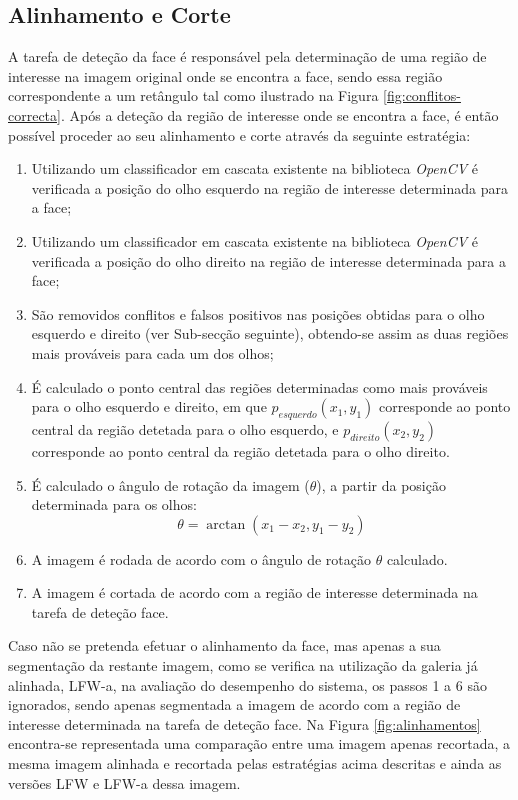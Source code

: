 \subsection{Alinhamento e Corte} \label{sec:alinhamentoEcorte}
A tarefa de deteção da face é responsável pela determinação de uma região de interesse na imagem original onde se encontra a face, sendo essa região correspondente a um retângulo tal como ilustrado na Figura \ref{fig:conflitos-correcta}. Após a deteção da região de interesse onde se encontra a face, é então possível proceder ao seu alinhamento e corte através da seguinte estratégia:

\begin{enumerate}
\item Utilizando um classificador em cascata existente na biblioteca \textit{OpenCV} é verificada a posição do olho esquerdo na região de interesse determinada para a face;
\item Utilizando um classificador em cascata existente na biblioteca \textit{OpenCV} é verificada a posição do olho direito na região de interesse determinada para a face;
\item São removidos conflitos e falsos positivos nas posições obtidas para o olho esquerdo e direito (ver Sub-secção seguinte), obtendo-se assim as duas regiões mais prováveis para cada um dos olhos;
\item É calculado o ponto central das regiões determinadas como mais prováveis para o olho esquerdo e direito, em que $p_{esquerdo}(x_1,y_1)$ corresponde ao ponto central da região detetada para o olho esquerdo, e  $p_{direito}(x_2,y_2)$ corresponde ao ponto central da região detetada para o olho direito.
\item É calculado o ângulo de rotação da imagem ($\theta$), a partir da posição determinada para os olhos:
\begin{equation}
\theta = \arctan(x_1 - x_2, y_1 - y_2)
\end{equation}
\item A imagem é rodada de acordo com o ângulo de rotação $\theta$ calculado.
\item A imagem é cortada de acordo com a região de interesse determinada na tarefa de deteção face.
\end{enumerate}

Caso não se pretenda efetuar o alinhamento da face, mas apenas a sua segmentação da restante imagem, como se verifica na utilização da galeria já alinhada, LFW-a, na avaliação do desempenho do sistema, os passos 1 a 6 são ignorados, sendo apenas segmentada a imagem de acordo com a região de interesse determinada na tarefa de deteção face. Na Figura \ref{fig:alinhamentos} encontra-se representada uma comparação entre uma imagem apenas recortada, a mesma imagem alinhada e recortada pelas estratégias acima descritas e ainda as versões LFW e LFW-a dessa imagem.

